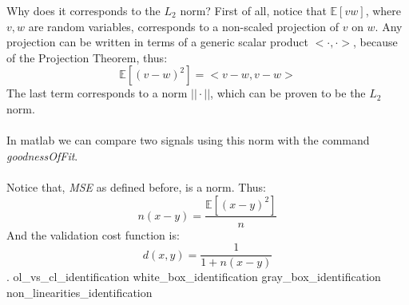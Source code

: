 Why does it corresponds to the $L_2$ norm? First of all, notice that $\mathbb{E}[vw]$, where $v,w$ are random variables, corresponds to a non-scaled projection of $v$ on $w$. Any projection can be written in terms of a generic scalar product $<\cdot,\cdot>$, because of the Projection Theorem,  thus:
$$\mathbb{E}[(v-w)^2] = <v-w,v-w>$$
The last term corresponds to a norm $||\cdot||$, which can be proven to be the $L_2$ norm.
\\ \\ 
In matlab we can compare two signals using this norm with the command \emph{goodnessOfFit}.
\\ \\ 
Notice that, \emph{MSE} as defined before, is a norm. Thus:
$$n(x-y) = \frac{\mathbb{E}[(x-y)^2]}{n}$$
And the validation cost function is:
$$d(x,y)= \frac{1}{1+n(x-y)}$$.
{ol_vs_cl_identification}
\newpage
{white_box_identification}
\newpage
{gray_box_identification}
\newpage
{non_linearities_identification}